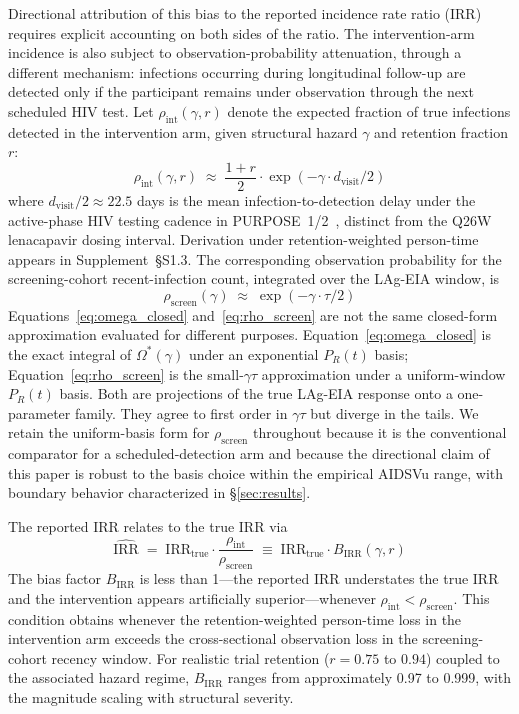 \documentclass[11pt]{article}
\begin{document}
Directional attribution of this bias to the reported incidence rate ratio (IRR) requires explicit accounting on both sides of the ratio. The intervention-arm incidence is also subject to observation-probability attenuation, through a different mechanism: infections occurring during longitudinal follow-up are detected only if the participant remains under observation through the next scheduled HIV test. Let $\rho_{\mathrm{int}}(\gamma, r)$ denote the expected fraction of true infections detected in the intervention arm, given structural hazard $\gamma$ and retention fraction $r$:
\begin{equation}
\rho_{\mathrm{int}}(\gamma, r) \;\approx\; \frac{1+r}{2} \cdot \exp(-\gamma \cdot d_{\mathrm{visit}}/2) \label{eq:rho_int}
\end{equation}
where $d_{\mathrm{visit}}/2 \approx 22.5$ days is the mean infection-to-detection delay under the active-phase HIV testing cadence in PURPOSE~1/2~\cite{bekker2024,kelley2025}, distinct from the Q26W lenacapavir dosing interval. Derivation under retention-weighted person-time appears in Supplement~\S S1.3. The corresponding observation probability for the screening-cohort recent-infection count, integrated over the LAg-EIA window, is
\begin{equation}
\rho_{\mathrm{screen}}(\gamma) \;\approx\; \exp(-\gamma \cdot \tau/2) \label{eq:rho_screen}
\end{equation}
Equations~\ref{eq:omega_closed} and~\ref{eq:rho_screen} are not the same closed-form approximation evaluated for different purposes. Equation~\ref{eq:omega_closed} is the exact integral of $\Omega^*(\gamma)$ under an exponential $P_R(t)$ basis; Equation~\ref{eq:rho_screen} is the small-$\gamma\tau$ approximation under a uniform-window $P_R(t)$ basis. Both are projections of the true LAg-EIA response onto a one-parameter family. They agree to first order in $\gamma\tau$ but diverge in the tails. We retain the uniform-basis form for $\rho_{\mathrm{screen}}$ throughout because it is the conventional comparator for a scheduled-detection arm and because the directional claim of this paper is robust to the basis choice within the empirical AIDSVu range, with boundary behavior characterized in §\ref{sec:results}.

The reported IRR relates to the true IRR via
\begin{equation}
\boxed{\;\widehat{\mathrm{IRR}} \;=\; \mathrm{IRR}_{\mathrm{true}} \cdot \frac{\rho_{\mathrm{int}}}{\rho_{\mathrm{screen}}} \;\equiv\; \mathrm{IRR}_{\mathrm{true}} \cdot B_{\mathrm{IRR}}(\gamma, r)\;} \label{eq:birr}
\end{equation}
The bias factor $B_{\mathrm{IRR}}$ is less than 1---the reported IRR understates the true IRR and the intervention appears artificially superior---whenever $\rho_{\mathrm{int}} < \rho_{\mathrm{screen}}$. This condition obtains whenever the retention-weighted person-time loss in the intervention arm exceeds the cross-sectional observation loss in the screening-cohort recency window. For realistic trial retention ($r = 0.75$ to $0.94$) coupled to the associated hazard regime, $B_{\mathrm{IRR}}$ ranges from approximately 0.97 to 0.999, with the magnitude scaling with structural severity.
\end{document}
